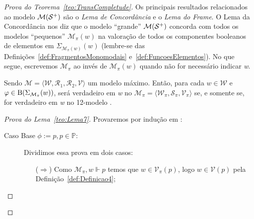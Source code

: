 \begin{apendicesenv}
\begin{proof}[Prova do Teorema~\ref{teo:TransCompletude}]
            Os principais resultados relacionados ao modelo \(\mathcal{M}(\mathcal{S}^{+})\) são o \textit{Lema de Concordância} e o \textit{Lema do Frame}.
            O Lema da Concordância nos diz que o modelo ``grande'' \(\mathcal{M}(\mathcal{S}^{+})\) concorda com todos os modelos ``pequenos'' \(\mathcal{M}_{\pi}(w)\) na valoração
            de todos os componentes booleanos de elementos em \(\Sigma_{\mathcal{M}_{\pi}(w)}(w)\) (lembre-se das Definições~\ref{def:FragmentosMonomodais} e~\ref{def:FuncoesElementos}).
            No que segue, escrevemos \(\mathcal{M}_{\pi}\) ao invés de \(\mathcal{M}_{\pi}(w)\) quando não for necessário indicar \textit{w}.

            \begin{lema}
                \label{teo:Lema7}
                Sendo \(\mathcal{M} = \langle \mathcal{W}, \mathcal{R}_{1}, \mathcal{R}_{2}, \mathcal{V} \rangle\) um modelo máximo. Então, para cada \(w \in \mathcal{W}\) e
                \(\varphi \in \operatorname{B}(\Sigma_{\mathcal{M}_{\pi}}(w))\), \PHI será verdadeiro em \textit{w} no \PImodelo
                \(\mathcal{M}_{\pi} = \langle \mathcal{W}_{\pi}, \mathcal{S}_{\pi}, \mathcal{V}_{\pi} \rangle\) se, e somente se, \PHI for verdadeiro em \textit{w} no 12-modelo .
            \end{lema}

            \begin{proof}[Prova do Lema~\ref{teo:Lema7}]
                Provaremos por indução em \PHI:
                \begin{description}
                    \item[\textnormal{Caso Base \(\phi := p, p \in \mathbb{P}\):}] Dividimos essa prova em dois casos:
                    \begin{itemize}
                        \item[(\(\Rightarrow\))] Como \(\mathcal{M}_{\pi}, w \Vdash p\) temos que \(w \in \mathcal{V}_{\pi}(p)\), logo \(w \in \mathcal{V}(p)\)
                            pela Definição~\ref{def:Definicao4};


\end{itemize}
\end{description}
\end{proof}
\end{proof}
\end{apendicesenv}
